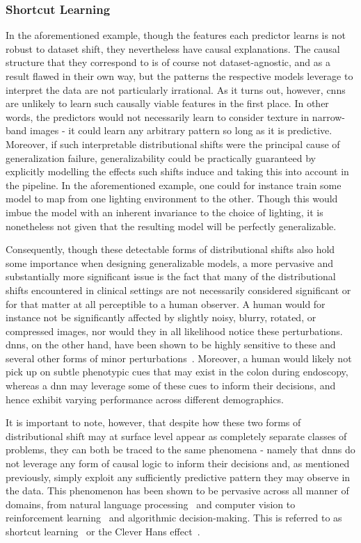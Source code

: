 	\subsubsection{Shortcut Learning}
	In the aforementioned example, though the features each predictor learns is not robust to dataset shift, they nevertheless have causal explanations. The causal structure that they correspond to is of course not dataset-agnostic, and as a result flawed in their own way, but the patterns the respective models leverage to interpret the data are not particularly irrational. As it turns out, however, \glspl{cnn} are unlikely to learn such causally viable features in the first place. In other words, the predictors would not necessarily learn to consider texture in narrow-band images - it could learn any arbitrary pattern so long as it is predictive. Moreover, if such interpretable distributional shifts were the principal cause of generalization failure, generalizability could be practically guaranteed by explicitly modelling the effects such shifts induce and taking this into account in the pipeline. In the aforementioned example, one could for instance train some model to map from one lighting environment to the other. Though this would imbue the model with an inherent invariance to the choice of lighting, it is nonetheless not given that the resulting model will be perfectly generalizable.

	Consequently, though these detectable forms of distributional shifts also hold some importance when designing generalizable models, a more pervasive and substantially more significant issue is the fact that many of the distributional shifts encountered in clinical settings are not necessarily considered significant or for that matter at all perceptible to a human observer. A human would for instance not be significantly affected by slightly noisy, blurry, rotated, or compressed images, nor would they in all likelihood notice these perturbations. \glspl{dnn}, on the other hand, have been shown to be highly sensitive to these and several other forms of minor perturbations~\cite{noise_robustness, corruption_robustness,adversarial_training}. Moreover, a human would likely not pick up on subtle phenotypic cues that may exist in the colon during endoscopy, whereas a \gls{dnn} may leverage some of these cues to inform their decisions, and hence exhibit varying performance across different demographics. 

	It is important to note, however, that despite how these two forms of distributional shift may at surface level appear as completely separate classes of problems, they can both be traced to the same phenomena - namely that \glspl{dnn} do not leverage any form of causal logic to inform their decisions and, as mentioned previously, simply exploit any sufficiently predictive pattern they may observe in the data. This phenomenon has been shown to be pervasive across all manner of domains, from natural language processing~\cite{dl_nlp} and computer vision to reinforcement learning~\cite{computer_vision} and algorithmic decision-making\cite{dl_recommend}. This is referred to as shortcut learning~\cite{shortcut_learning} or the Clever Hans effect~\cite{cleverhans}. 

